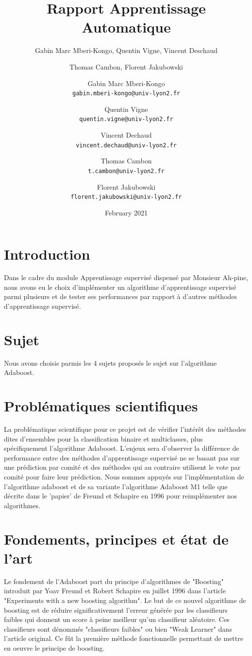 \documentclass{article}
\title{Rapport Apprentissage Automatique}
\author{Gabin Marc Mberi-Kongo, Quentin Vigne, Vincent Deschaud}
\author{Thomas Cambon, Florent Jakubowski }
\author{
  Gabin Marc Mberi-Kongo\\
  \texttt{gabin.mberi-kongo@univ-lyon2.fr}
  \and
  Quentin Vigne\\
  \texttt{quentin.vigne@univ-lyon2.fr}
  \and
  Vincent Dechaud\\
  \texttt{vincent.dechaud@univ-lyon2.fr}
  \and
  Thomas Cambon\\
  \texttt{t.cambon@univ-lyon2.fr}
  \and
  Florent Jakubowski\\
  \texttt{florent.jakubowski@univ-lyon2.fr}
}
\date{February 2021}
\begin{document}
\maketitle

\tableofcontents

\section{Introduction}

Dans le cadre du module Apprentissage supervisé dispensé par Monsieur Ah-pine, nous avons eu le choix d'implémenter un algorithme d'apprentissage supervisé parmi plusieurs et de tester ses performances par rapport à d'autres méthodes d'apprentissage supervisé. 

\section{Sujet}
Nous avons choisis parmis les 4 sujets proposés le sujet sur l'algorithme Adaboost.
\section{Problématiques scientifiques}
La problématique scientifique pour ce projet est de vérifier l'intérêt des méthodes dites d'ensembles pour la classification binaire et multiclasses, plus spécifiquement l'algorithme Adaboost. L'enjeux sera d'observer la différence de performance entre des méthodes d'apprentissage supervisé ne se basant pas sur une prédiction par comité et des méthodes qui au contraire utilisent le vote par comité pour faire leur prédiction.
Nous sommes appuyés sur l'implémentation de l'algorithme adaboost et de sa variante l'algorithme Adaboost M1 telle que décrite dans le 'papier' de Freund et Schapire \citep{FreundSchapire1996} en 1996 pour reimplémenter nos algorithmes.

\section{Fondements, principes et état de l'art}
Le fondement de l'Adaboost part du principe d'algorithmes de "Boosting" introduit par Yoav Freund et Robert Schapire en juillet 1996 dans l'article "Experiments with a new boosting algorithm". Le but de ce nouvel algorithme de boosting est de réduire significativement l'erreur générée par les classifieurs faibles qui donnent un score à peine meilleur qu'un classifieur aléatoire. Ces classifieurs sont dénommés "classifieurs faibles" ou bien "Weak Learner" dans l'article original. Ce fût la première méthode fonctionnelle permettant de mettre en oeuvre le principe de boosting.
\end{document}
